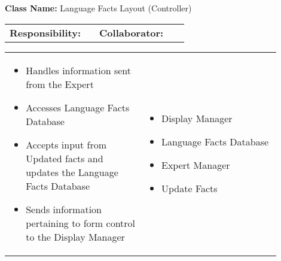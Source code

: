 \begin{cards}[]
    \textbf{Class Name:} Language Facts Layout (Controller)
    \tcbline
    \begin{tabular}{p{0.45\linewidth} | p{0.45\linewidth}}
        \textbf{Responsibility:}& 
        \textbf{Collaborator:}\\
    \end{tabular}
    \tcbline
    \begin{tabular}{p{0.45\linewidth} | p{0.45\linewidth}}
        \begin{itemize}
            \item Handles information sent from the Expert
            \item Accesses Language Facts Database
            \item Accepts input from Updated facts and updates the Language Facts Database
            \item Sends information pertaining to form control to the Display Manager
             
        \end{itemize}
        &
        \begin{itemize}
            \item Display Manager
            \item Language Facts Database
            \item Expert Manager
            \item Update Facts
            
        \end{itemize}
    \end{tabular}
\end{cards}